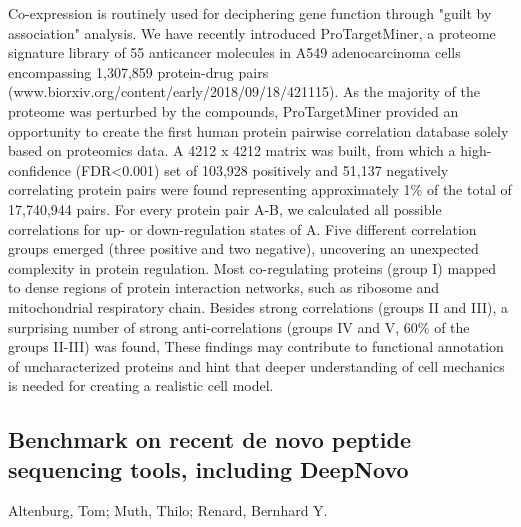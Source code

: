 {Co-expression is routinely used for deciphering gene function through "guilt by association" analysis. We have recently introduced ProTargetMiner, a proteome signature library of 55 anticancer molecules in A549 adenocarcinoma cells encompassing 1,307,859 protein-drug pairs \newline (www.biorxiv.org/content/early/2018/09/18/421115). As the majority of the proteome was perturbed by the compounds, ProTargetMiner provided an opportunity to create the first human protein pairwise correlation database solely based on proteomics data. A 4212 x 4212 matrix was built, from which a high-confidence (FDR<0.001) set of 103,928 positively and 51,137 negatively correlating protein pairs were found representing approximately 1\% of the total of 17,740,944 pairs. For every protein pair A-B, we calculated all possible correlations for up- or down-regulation states of A. Five different correlation groups emerged (three positive and two negative), uncovering an unexpected complexity in protein regulation. Most co-regulating proteins (group I) mapped to dense regions of protein interaction networks, such as ribosome and mitochondrial respiratory chain. Besides strong correlations (groups II and III), a surprising number of strong anti-correlations (groups IV and V, 60\% of the groups II-III) was found, These findings may contribute to functional annotation of uncharacterized proteins and hint that deeper understanding of cell mechanics is needed for creating a realistic cell model.


\subsection*{\color{eubicRed} Benchmark on recent de novo peptide sequencing tools, including DeepNovo}
{\color{eubicGray}Altenburg, Tom;
Muth, Thilo;
Renard, Bernhard Y.}

}
